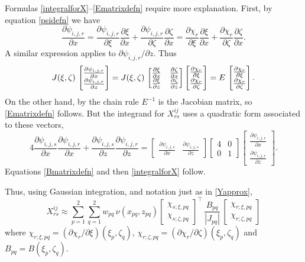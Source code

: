 \documentclass[11pt,final,reqno]{amsart}
\theoremstyle{remark}
\theoremstyle{definition}
\begin{document}
Formulas \eqref{integralforX}--\eqref{Ematrixdefn} require more explanation.  First, by equation \eqref{psidefn} we have
   $$\frac{\partial\psi_{i,j,r}}{\partial x} = \frac{\partial\psi_{i,j,r}}{\partial \xi} \frac{\partial \xi}{\partial x} + \frac{\partial\psi_{i,j,r}}{\partial \zeta} \frac{\partial \zeta}{\partial x} = \frac{\partial\chi_r}{\partial \xi} \frac{\partial \xi}{\partial x} + \frac{\partial\chi_r}{\partial \zeta} \frac{\partial \zeta}{\partial x}.$$
A similar expression applies to $\partial\psi_{i,j,r}/\partial z$.  Thus
   $$J(\xi,\zeta)\, \begin{bmatrix}
       \frac{\partial\psi_{i,j,r}}{\partial x} \\
       \frac{\partial\psi_{i,j,r}}{\partial z}
     \end{bmatrix}
  = J(\xi,\zeta)\, \begin{bmatrix}
    \frac{\partial \xi}{\partial x} & \frac{\partial \zeta}{\partial x} \\
    \frac{\partial \xi}{\partial z} & \frac{\partial \zeta}{\partial z}
  \end{bmatrix} \begin{bmatrix}\frac{\partial\chi_{r}}{\partial \xi} \\ \frac{\partial\chi_{r}}{\partial \zeta}\end{bmatrix}
  = E\,\begin{bmatrix}\frac{\partial\chi_{r}}{\partial \xi} \\ \frac{\partial\chi_{r}}{\partial \zeta}\end{bmatrix}.$$
On the other hand, by the chain rule $E^{-1}$ is the Jacobian matrix, so \eqref{Ematrixdefn} follows.  But the integrand for $X^{ij}_{rs}$ uses a quadratic form associated to these vectors,
	$$4\frac{\partial\psi_{i,j,s}}{\partial x} \frac{\partial\psi_{i,j,r}}{\partial x} + \frac{\partial\psi_{i,j,s}}{\partial z} \frac{\partial\psi_{i,j,r}}{\partial z} = \begin{bmatrix}
       \frac{\partial\psi_{i,j,s}}{\partial x} &
       \frac{\partial\psi_{i,j,s}}{\partial z}
     \end{bmatrix}  
     \begin{bmatrix} 4 & 0 \\ 0 & 1 \end{bmatrix} \begin{bmatrix}
       \frac{\partial\psi_{i,j,r}}{\partial x} \\
       \frac{\partial\psi_{i,j,r}}{\partial z}
     \end{bmatrix}.$$
Equations \eqref{Bmatrixdefn} and then \eqref{integralforX} follow.

Thus, using Gaussian integration, and notation just as in \eqref{Yapprox},
\begin{equation}\label{Xapprox}
	X^{ij}_{rs} \approx \sum_{p=1}^2 \sum_{q=1}^2 w_{pq}\, \nu(x_{pq},z_{pq}) \begin{bmatrix} \chi_{s;\xi,pq} \\ \chi_{s;\zeta,pq} \end{bmatrix}^\top \, \frac{B_{pq}}{ |J_{pq}|} \, \begin{bmatrix} \chi_{r;\xi,pq} \\ \chi_{r;\zeta,pq} \end{bmatrix} 
\end{equation}
where $\chi_{r;\xi,pq} = (\partial\chi_r/\partial \xi)(\xi_p,\zeta_q)$, $\chi_{r;\zeta,pq} = (\partial\chi_r/\partial \zeta)(\xi_p,\zeta_q)$ and $B_{pq}=B(\xi_p,\zeta_q)$.
\end{document}
